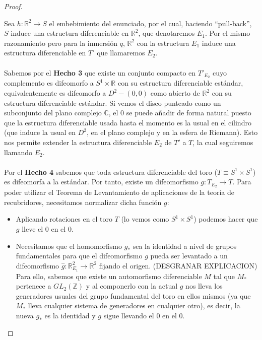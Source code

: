 \begin{proof}
\begin{enumerate}
			Sea $h:\mathbb{R}^2 \rightarrow S$ el embebimiento del enunciado, por el cual, haciendo ``pull-back'', $S$ induce una estructura diferenciable en $\mathbb{R}^2$, que denotaremos $E_1$. Por el mismo razonamiento pero para la inmersión $q$, $\mathbb{R}^2$ con la estructura $E_1$ induce una estructura diferenciable en $T'$ que llamaremos $E_2$.\\
			\\ Sabemos por el \textbf{Hecho 3} que existe un conjunto compacto en $T'_{E_2}$ cuyo complemento es difeomorfo a $S^1\times \mathbb{R}$ con su estructura diferenciable estándar, equivalentemente es difeomorfo a $D^2 - {(0,0)}$ como abierto de $\mathbb{R}^2$ con su estructura diferenciable estándar. Si vemos el disco punteado como un subconjunto del plano complejo $\mathbb{C}$, el $0$ se puede añadir de forma natural puesto que la estructura diferenciable usada hasta el momento es la usual en el cilindro (que induce la usual en $D^2$, en el plano complejo y en la esfera de Riemann). Esto nos permite extender la estructura diferenciable $E_2$ de $T'$ a $T$, la cual seguiremos llamando $E_2$.\\
			\\ Por el \textbf{Hecho 4} sabemos que toda estructura diferenciable del toro ($T \equiv S^1\times S^1$) es difeomorfa a la estándar. Por tanto, existe un difeomorfismo $g: T_{E_2} \rightarrow T$. Para poder utilizar el Teorema de Levantamiento de aplicaciones de la teoría de recubridores, necesitamos normalizar dicha función $g$:
						
			\begin{itemize}
				\item Aplicando rotaciones en el toro $T$ (lo vemos como $S^1\times S^1$) podemos hacer que $g$ lleve el $0$ en el $0$.
				\item Necesitamos que el homomorfismo $g_*$ sea la identidad a nivel de grupos fundamentales para que el difeomorfismo $g$ pueda ser levantado a un difeomorfismo $\widehat{g} : \mathbb{R}^2_{E_1} \rightarrow \mathbb{R}^2$ fijando el origen. (DESGRANAR EXPLICACION) Para ello, sabemos que existe un automorfismo diferenciable $M$ tal que $M_*$ pertenece a $GL_2(\mathbb{Z})$ y al componerlo con la actual $g$ nos lleva los generadores usuales del grupo fundamental del toro en ellos mismos (ya que $M_*$ lleva cualquier sistema de generadores en cualquier otro), es decir, la nueva $g_*$ es la identidad y $g$ sigue llevando el $0$ en el $0$. \\
			\end{itemize}
			

\end{enumerate}
\end{proof}

